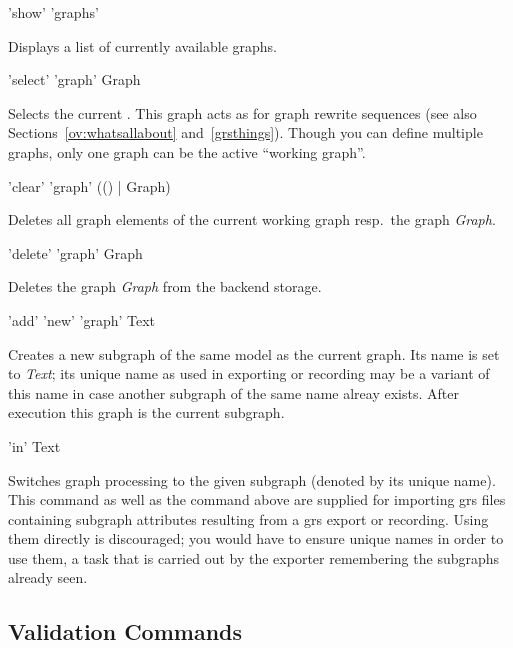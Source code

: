 \begin{rail}
  'show' 'graphs'
\end{rail}
Displays a list of currently available graphs.

\begin{rail}
  'select' 'graph' Graph
\end{rail}
Selects the current .
This graph acts as \emph{} for graph rewrite sequences (see also Sections~\ref{ov:whatsallabout} and~\ref{grsthings}).
Though you can define multiple graphs, only one graph can be the active ``working graph''.

\begin{rail}
  'clear' 'graph' (() | Graph)
\end{rail}
Deletes all graph elements of the current working graph resp.\ the graph \emph{Graph}.

\begin{rail}
  'delete' 'graph' Graph
\end{rail}
Deletes the graph \emph{Graph} from the backend storage.

\begin{rail}
  'add' 'new' 'graph' Text
\end{rail}
Creates a new subgraph of the same model as the current graph.
Its name is set to \emph{Text}; its unique name as used in exporting or recording may be a variant of this name in case another subgraph of the same name alreay exists.
After execution this graph is the current subgraph.

\begin{rail}
  'in' Text
\end{rail}
Switches graph processing to the given subgraph (denoted by its unique name).
This command as well as the command above are supplied for importing grs files containing subgraph attributes resulting from a grs export or recording.
Using them directly is discouraged; you would have to ensure unique names in order to use them, a task that is carried out by the exporter remembering the subgraphs already seen.

\subsection{Validation Commands}


